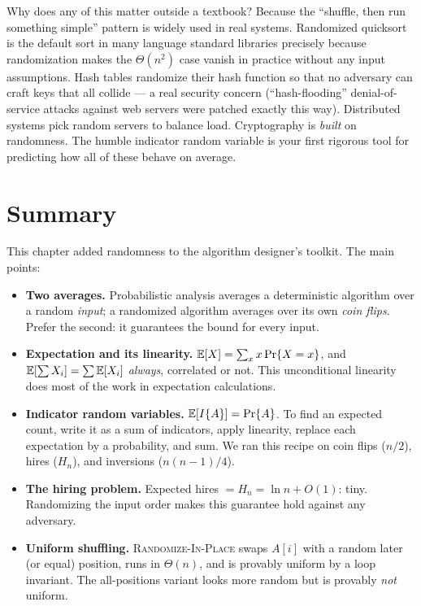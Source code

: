 \begin{aestheticbox}
Why does any of this matter outside a textbook? Because the ``shuffle, then run
something simple'' pattern is widely used in real systems. Randomized quicksort
is the default sort in many language standard libraries precisely because
randomization makes the $\Theta(n^2)$ case vanish in practice without any input
assumptions. Hash tables randomize their hash function so that no adversary can
craft keys that all collide --- a real security concern (``hash-flooding''
denial-of-service attacks against web servers were patched exactly this way).
Distributed systems pick random servers to balance load. Cryptography is
\emph{built} on randomness. The humble indicator random variable is your first
rigorous tool for predicting how all of these behave on average.
\end{aestheticbox}

\section{Summary}

This chapter added randomness to the algorithm designer's toolkit. The main
points:

\begin{itemize}
  \item \textbf{Two averages.} Probabilistic analysis averages a deterministic
        algorithm over a random \emph{input}; a randomized algorithm averages
        over its own \emph{coin flips}. Prefer the second: it guarantees the
        bound for every input.
  \item \textbf{Expectation and its linearity.} $\mathbb{E}[X] = \sum_x x\Pr\{X=x\}$,
        and $\mathbb{E}[\sum X_i] = \sum \mathbb{E}[X_i]$ \emph{always}, correlated or not. This
        unconditional linearity does most of the work in expectation calculations.
  \item \textbf{Indicator random variables.} $\mathbb{E}[I\{A\}] = \Pr\{A\}$. To find an
        expected count, write it as a sum of indicators, apply linearity, replace
        each expectation by a probability, and sum. We ran this recipe on coin
        flips ($n/2$), hires ($H_n$), and inversions ($n(n-1)/4$).
  \item \textbf{The hiring problem.} Expected hires $= H_n = \ln n + O(1)$:
        tiny. Randomizing the input order makes this guarantee hold against any
        adversary.
  \item \textbf{Uniform shuffling.} \textsc{Randomize-In-Place} swaps $A[i]$ with
        a random later (or equal) position, runs in $\Theta(n)$, and is provably
        uniform by a loop invariant. The all-positions variant looks more random
        but is provably \emph{not} uniform.
\end{itemize}

